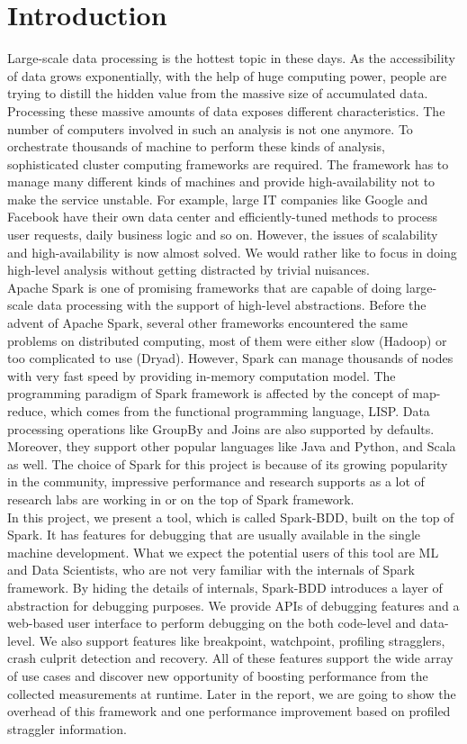 \documentclass{acm_proc_article-sp}
\begin{document}
\section{Introduction}
Large-scale data processing is the hottest topic in these days. As the accessibility of data grows exponentially, with the help of huge computing power, people are trying to distill the hidden value from the massive size of accumulated data.\\
Processing these massive amounts of data exposes different characteristics. The number of computers involved in such an analysis is not one anymore. To orchestrate thousands of machine to perform these kinds of analysis, sophisticated cluster computing frameworks are required. The framework has to manage many different kinds of machines and provide high-availability not to make the service unstable. For example, large IT companies like Google and Facebook have their own data center and efficiently-tuned methods to process user requests, daily business logic and so on. However, the issues of scalability and high-availability is now almost solved. We would rather like to focus in doing high-level analysis without getting distracted by trivial nuisances.\\
Apache Spark is one of promising frameworks that are capable of doing large-scale data processing with the support of high-level abstractions. Before the advent of Apache Spark, several other frameworks encountered the same problems on distributed computing, most of them were either slow (Hadoop) or too complicated to use (Dryad). However, Spark can manage thousands of nodes with very fast speed by providing in-memory computation model. The programming paradigm of Spark framework is affected by the concept of map-reduce, which comes from the functional programming language, LISP. Data processing operations like GroupBy and Joins are also supported by defaults. Moreover, they support other popular languages like Java and Python, and Scala as well. The choice of Spark for this project is because of its growing popularity in the community, impressive performance and research supports as a lot of research labs are working in or on the top of Spark framework.\\
In this project, we present a tool, which is called Spark-BDD, built on the top of Spark. It has features for debugging that are usually available in the single machine development. What we expect the potential users of this tool are ML and Data Scientists, who are not very familiar with the internals of Spark framework. By hiding the details of internals, Spark-BDD introduces a layer of abstraction for debugging purposes. We provide APIs of debugging features and a web-based user interface to perform debugging on the both code-level and data-level. We also support features like breakpoint, watchpoint, profiling stragglers, crash culprit detection and recovery. All of these features support the wide array of use cases and discover new opportunity of boosting performance from the collected measurements at runtime. Later in the report, we are going to show the overhead of this framework and one performance improvement based on profiled straggler information.
\end{document}
